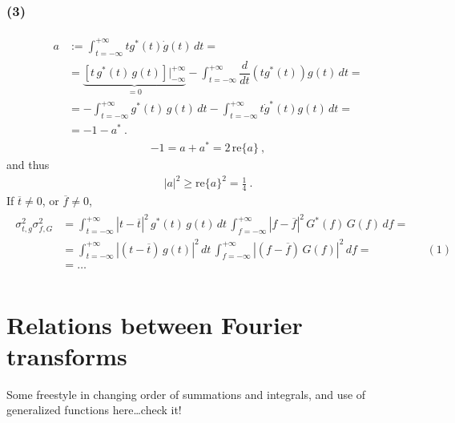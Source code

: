 \documentclass[letterpaper,10pt,english]{jupyterBook}
\begin{document}
\subsubsection*{(3)}
\begin{equation*}
\begin{split}\begin{aligned}
  a 
  & := \int_{t=-\infty}^{+\infty} t g^*(t) \dot{g}(t) \, dt = \\
  &  = \underbrace{\left[ t \, g^*(t) \, g(t) \right]|_{-\infty}^{+\infty}}_{=0} - \int_{t=-\infty}^{+\infty} \dfrac{d}{dt} \left( t g^*(t) \right) g(t) \, dt = \\
  & = - \int_{t=-\infty}^{+\infty}  g^*(t) \,  g(t) \, dt - \int_{t=-\infty}^{+\infty} t \dot{g}^*(t) g(t) \, dt = \\
  & = - 1 - a^* \ .
\end{aligned}\end{split}
\end{equation*}\begin{equation*}
\begin{split}-1 = a + a^* = 2 \, \text{re}\{a\} \ ,\end{split}
\end{equation*}
\sphinxAtStartPar
and thus
\begin{equation*}
\begin{split}|a|^2 \ge \text{re}\{a\}^2 = \frac{1}{4} \ .\end{split}
\end{equation*}
\sphinxAtStartPar
If \(\overline{t} \ne 0\), or \(\overline{f} \ne 0\),
\begin{equation*}
\begin{split}\begin{aligned}
 \sigma_{t,g}^2 \sigma_{f,G}^2
 & = \int_{t=-\infty}^{+\infty} \left| t - \overline{t} \right|^2 \, g^*(t) \, g(t)  \, dt \,  \int_{f=-\infty}^{+\infty} \left| f - \overline{f} \right|^2 \, G^*(f) \, G(f) \, df = \\
 & = \int_{t=-\infty}^{+\infty} \left| ( t - \overline{t} ) \, g(t) \right|^2 \, dt \,  \int_{f=-\infty}^{+\infty} \left| ( f - \overline{f} ) \,  G(f)\right|^2 \, df = && (1) \\
 & = \dots \\
\end{aligned}\end{split}
\end{equation*}
\sphinxstepscope


\section{Relations between Fourier transforms}
\label{\detokenize{ch/complex/fourier-transforms:relations-between-fourier-transforms}}\label{\detokenize{ch/complex/fourier-transforms:complex-fourier-transforms}}\label{\detokenize{ch/complex/fourier-transforms::doc}}
\sphinxAtStartPar
Some freestyle in changing order of summations and integrals, and use of generalized functions here…check it!
\end{document}
